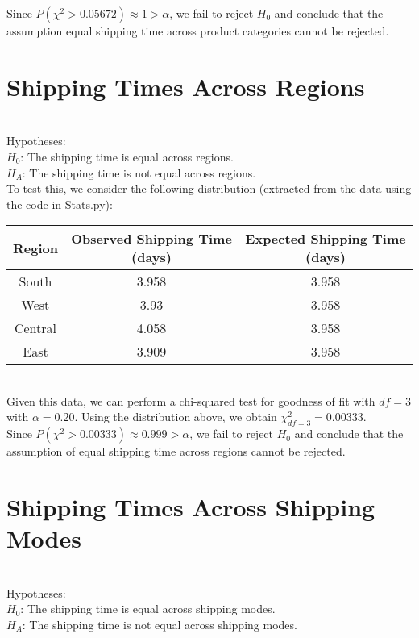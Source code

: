 \documentclass[11pt]{amsart}
\begin{document}
Since $P(\chi^2 > 0.05672) \approx 1 > \alpha$, we fail to reject $H_0$ and conclude that the assumption equal shipping time across product categories cannot be rejected.
\newpage
\section{Shipping Times Across Regions}
\hrulefill \\
Hypotheses:\\
$H_0$: The shipping time is equal across regions.\\
$H_A$: The shipping time is not equal across regions. \\

To test this, we consider the following distribution (extracted from the data using the code in Stats.py):
\begin{center}
\begin{tabular}{ |c|c|c| } 
 \hline
 Region & Observed Shipping Time (days)& Expected Shipping Time (days) \\ 
\hline
\hline
South & 3.958 & 3.958\\
West & 3.93 & 3.958\\
Central & 4.058 & 3.958\\
East & 3.909 & 3.958\\
 \hline
\end{tabular}
\end{center}
\hfill \\
Given this data, we can perform a chi-squared test for goodness of fit with $df=3$ with $\alpha=0.20$. Using the distribution above, we obtain $\chi^2_{df=3}=0.00333$. \\

Since $P(\chi^2 > 0.00333) \approx 0.999 > \alpha$, we fail to reject $H_0$ and conclude that the assumption of equal shipping time across regions cannot be rejected.
\newpage

\section{Shipping Times Across Shipping Modes}
\hrulefill \\
Hypotheses:\\
$H_0$: The shipping time is equal across shipping modes.\\
$H_A$: The shipping time is not equal across shipping modes. \\
\end{document}

